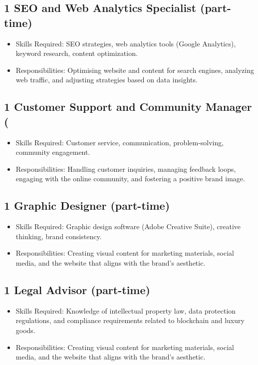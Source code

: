 \documentclass{tufte-handout}
\begin{document}
\subsection{1 SEO and Web Analytics Specialist (part-time)}\label{sec:page-layout}
\begin{itemize}
    \item Skills Required: SEO strategies, web analytics tools (Google Analytics), keyword research, content optimization.
    \item Responsibilities: Optimising website and content for search engines, analyzing web traffic, and adjusting strategies based on data insights.
\end{itemize}
\subsection{1 Customer Support and Community Manager (}\label{sec:page-layout}
\begin{itemize}
    \item Skills Required: Customer service, communication, problem-solving, community engagement.
    \item Responsibilities: Handling customer inquiries, managing feedback loops, engaging with the online community, and fostering a positive brand image.
\end{itemize}
\subsection{1 Graphic Designer (part-time)}\label{sec:page-layout}
\begin{itemize}
    \item Skills Required: Graphic design software (Adobe Creative Suite), creative thinking, brand consistency.
    \item Responsibilities: Creating visual content for marketing materials, social media, and the website that aligns with the brand's aesthetic.
\end{itemize}
\subsection{1 Legal Advisor (part-time)}\label{sec:page-layout}
\begin{itemize}
    \item Skills Required: Knowledge of intellectual property law, data protection regulations, and compliance requirements related to blockchain and luxury goods.
    \item Responsibilities: Creating visual content for marketing materials, social media, and the website that aligns with the brand's aesthetic.
\end{itemize}
\end{document}
